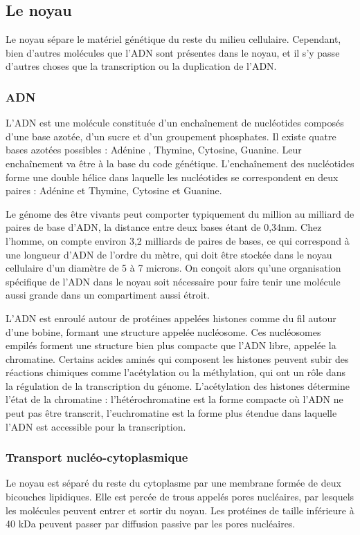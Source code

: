 \documentclass{report}
\begin{document}
\subsection{Le noyau}

Le noyau sépare le matériel génétique du reste du milieu cellulaire. Cependant, bien d'autres molécules que l'ADN sont présentes dans le noyau, et il s'y passe d'autres choses que la transcription ou la duplication de l'ADN. 

\subsubsection{ADN}

L'ADN est une molécule constituée d'un enchaînement de nucléotides composés d'une base azotée, d'un sucre et d'un groupement phosphates. Il existe quatre bases azotées possibles : Adénine , Thymine, Cytosine, Guanine. Leur enchaînement va être à la base du code génétique.
L'enchaînement des nucléotides forme une double hélice dans laquelle les nucléotides se correspondent en deux paires : Adénine et Thymine, Cytosine et Guanine. 

Le génome des être vivants peut comporter typiquement du million au milliard de paires de base d'ADN, la distance entre deux bases étant de 0,34nm. Chez l'homme, on compte environ 3,2 milliards de paires de bases, ce qui correspond à une longueur d'ADN de l'ordre du mètre, qui doit être stockée dans le noyau cellulaire d'un diamètre de 5 à 7 microns. 
On conçoit alors qu'une organisation spécifique de l'ADN dans le noyau soit nécessaire pour faire tenir une molécule aussi grande dans un compartiment aussi étroit. 

L'ADN est enroulé autour de protéines appelées histones comme du fil autour d'une bobine, formant une structure appelée nucléosome. Ces nucléosomes empilés forment une structure bien plus compacte que l'ADN libre, appelée la chromatine. Certains acides aminés qui composent les histones peuvent subir des réactions chimiques comme l'acétylation ou la méthylation, qui ont un rôle dans la régulation de la transcription du génome. L'acétylation des histones détermine l'état de la chromatine : l'hétérochromatine est la forme compacte où l'ADN ne peut pas être transcrit, l'euchromatine est la forme plus étendue dans laquelle l'ADN est accessible pour la transcription. 

\subsubsection{Transport nucléo-cytoplasmique}
Le noyau est séparé du reste du cytoplasme par une membrane formée de deux bicouches lipidiques. Elle est percée de trous appelés pores nucléaires, par lesquels les molécules peuvent entrer et sortir du noyau. Les protéines de taille inférieure à 40 kDa peuvent passer par diffusion passive par les pores nucléaires. 
\end{document}
